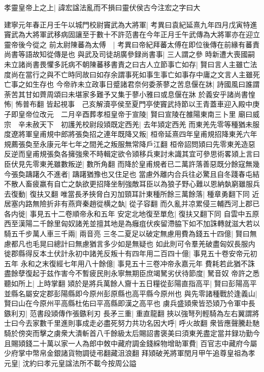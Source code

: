 孝靈皇帝上之上|{
	諱宏諡法亂而不損曰靈伏侯古今注宏之字曰大}


建寧元年春正月壬午以城門校尉竇武為大將軍|{
	考異曰袁紀延熹九年四月戊寅特進竇武為大將軍武移病固讓至于數十不許范書在今年正月壬午武傳為大將軍亦在迎立靈帝後今從之}
前太尉陳蕃為太傅　|{
	考異曰帝紀拜蕃太傅在即位後傳在前緣有蕃責尚書等語故知從傳是也}
與武及司徒胡廣參録尚書事|{
	三人謂之參}
時新遭大喪國嗣未立諸尚書畏懼多託病不朝陳蕃移書責之曰古人立節事亡如存|{
	賢曰言人主雖亡法度尚在當行之與不亡時同故曰如存余謂事死如事生事亡如事存中庸之文言人主雖死亡事之如生存也}
今帝祚未立政事日蹙諸君奈何委荼蓼之苦息偃在牀|{
	詩國風曰誰謂荼苦其甘如薺周頌曰未堪家多難予又集于蓼小雅曰或息偃在牀}
於義安乎諸尚書惶怖|{
	怖普布翻}
皆起視事　己亥解瀆亭侯至夏門亭使竇武持節以王青蓋車迎入殿中庚子即皇帝位改元　二月辛酉葬孝桓皇帝于宣陵|{
	賢曰宣陵在雒陽東南三卜里}
廟曰威宗　辛未赦天下　初護羌校尉段熲既定西羌|{
	去年熲定西羌}
而東羌先零等種猶未服度遼將軍皇甫規中郎將張奐招之連年既降又叛|{
	桓帝延熹四年皇甫規招降東羌六年規薦張奐至永康元年七年之間羌之叛服無常降戶江翻}
桓帝詔問熲曰先零東羌造惡反逆而皇甫規張奐各擁強衆不時輯定欲令熲移兵東討未識其宜可參思術畧熲上言曰臣伏見先零東羌雖數叛逆|{
	數所角翻}
而降於皇甫規者已二萬許落善惡既分餘寇無幾今張奐躊躇久不進者|{
	躊躇猶豫也又住足也}
當慮外離内合兵往必驚且自冬踐春屯結不散人畜疲羸有自亡之埶欲更招降坐制強敵耳臣以為狼子野心難以恩納埶窮雖服兵去復動|{
	復扶又翻}
唯當長矛挾脅白刃加頸耳計東種所餘三萬餘落|{
	種章勇翻下同}
近居塞内路無險折非有燕齊秦趙從横之埶|{
	從子容翻}
而久亂并凉累侵三輔西河上郡已各内徙|{
	事見五十二卷順帝永和五年}
安定北地復至單危|{
	復扶又翻下同}
自雲中五原西至漢陽二千餘里匈奴諸羌並擅其地是為癰疽伏疾留滯脇下如不加誅轉就滋大若以騎五千步萬人車三千兩|{
	兩音亮}
三冬二夏足以破定無慮用費為錢五十四億|{
	賢曰無慮都凡也毛晃曰總計曰無慮猶言多少如是無疑也}
如此則可令羣羌破盡匈奴長服内徙郡縣得反本土伏計永初中諸羌反叛十有四年用二百四十億|{
	事見五十卷安帝元初五年}
永和之末復經七年用八十餘億|{
	事見五十三卷冲帝永嘉元年}
費耗若此猶不誅盡餘孽復起于兹作害今不暫疲民則永寧無期臣庶竭駑劣伏待節度|{
	駑音奴}
帝許之悉聽如所上|{
	上時掌翻}
熲於是將兵萬餘人齎十五日糧從彭陽直指高平|{
	賢曰彭陽高平並縣名屬安定郡彭陽縣即今原州彭原縣也高平縣今原州也}
與先零諸種戰於逢義山|{
	賢曰山在今原州平高縣杜佑曰平高縣即漢之高平也}
虜兵盛熲衆皆恐熲乃令軍中長鏃利刃|{
	范書段熲傳作張鏃利刃}
長矛三重|{
	重直龍翻}
挾以強弩列輕騎為左右翼謂將士曰今去家數千里進則事成走必盡死努力共功名因大呼|{
	呼火故翻}
衆皆應聲騰赴馳騎於傍突而擊之虜衆大潰斬首八千餘級太后賜詔書褒美曰須東羌盡定當并録功勤今且賜熲錢二十萬以家一人為郎中敇中藏府調金錢綵物增助軍費|{
	百官志中藏府今屬少府掌中幣帛金銀諸貨物調徒弔翻藏沮浪翻}
拜熲破羌將軍閏月甲午追尊皇祖為孝元皇|{
	沈約曰孝元皇諡法所不載今按周公謚}


